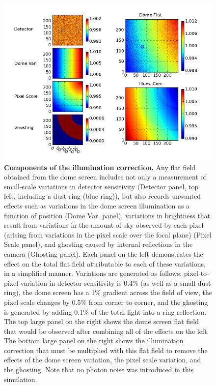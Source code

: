 \documentclass[12pt,preprint]{aastex}
\begin{document}
\begin{figure}[htbp]
\includegraphics[width=6in]{flatfield_corr}
\caption{ {\small
{\bf Components of the illumination correction.}
Any flat field obtained from the dome screen includes not only a
measurement of small-scale variations in detector sensitivity
(Detector panel, top left, including a dust ring (blue ring)), but
also records unwanted effects such as variations in the dome screen
illumination as a function of position (Dome Var. panel), variations in brightness that
result from variations in the amount of sky observed by each pixel
(arising from variations in the pixel scale over the focal plane)
(Pixel Scale panel), and
ghosting caused by internal reflections in the camera (Ghosting panel).
Each panel on the left demonstrates the effect on the total flat field
attributable to each of these variations, in a simplified manner. 
Variations are generated as follows: pixel-to-pixel variation in
detector sensitivity is 0.4\% (as well as a small dust ring), the dome
screen has a 1\% gradient across the field of view, the pixel scale
changes by 0.5\% from corner to corner, and the ghosting is generated
by adding 0.1\% of the total light into a ring reflection. 
The top large panel on the right shows the dome screen flat field that
would be observed after combining all of the effects on the left. The bottom large panel on
the right shows the illumination correction that must be multiplied with 
this flat field to remove the effects of the dome screen variation,
the pixel scale variation, and the ghosting.   Note that no photon noise was
introduced in this simulation. }}  \label{fig:flatfield}
\end{figure}
\end{document}
